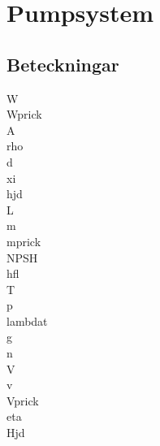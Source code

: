 \chapter{Pumpsystem}
\section*{Beteckningar}

\acrfull{W} \\
\acrfull{Wprick} \\
\acrfull{A} \\
\acrfull{rho} \\
\acrfull{d} \\
\acrfull{xi} \\
\acrfull{hjd} \\
\acrfull{L} \\
\acrfull{m} \\
\acrfull{mprick} \\
\acrfull{NPSH} \\
\acrfull{hfl} \\
\acrfull{T} \\
\acrfull{p} \\
\acrfull{lambdat} \\
\acrfull{g} \\
\acrfull{n} \\
\acrfull{V} \\
\acrfull{v} \\
\acrfull{Vprick} \\
\acrfull{eta} \\
\acrfull{Hjd}

